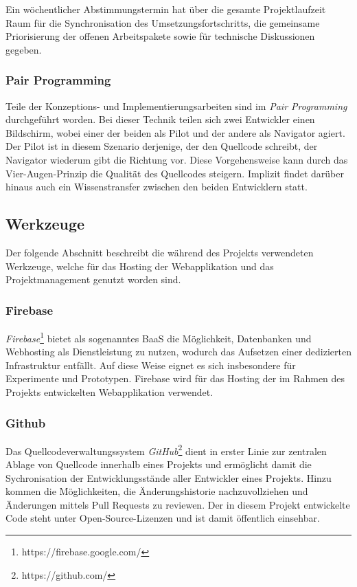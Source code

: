 Ein wöchentlicher Abstimmungstermin hat über die gesamte Projektlaufzeit Raum für die Synchronisation des Umsetzungsfortschritts, die gemeinsame Priorisierung der offenen Arbeitspakete sowie für technische Diskussionen gegeben.

\subsubsection{Pair Programming}
\label{pair_programming}

Teile der Konzeptions- und Implementierungsarbeiten sind im \emph{Pair Programming} durchgeführt worden. Bei dieser Technik teilen sich zwei Entwickler einen Bildschirm, wobei einer der beiden als Pilot und der andere als Navigator agiert. Der Pilot ist in diesem Szenario derjenige, der den Quellcode schreibt, der Navigator wiederum gibt die Richtung vor. Diese Vorgehensweise kann durch das Vier-Augen-Prinzip die Qualität des Quellcodes steigern. Implizit findet darüber hinaus auch ein Wissenstransfer zwischen den beiden Entwicklern statt.

\subsection{Werkzeuge}
\label{werkzeuge_und_projektstruktur}

Der folgende Abschnitt beschreibt die während des Projekts verwendeten Werkzeuge, welche für das Hosting der Webapplikation und das Projektmanagement genutzt worden sind.

\subsubsection{Firebase}
\label{firebase}

\emph{Firebase}\footnote{https://firebase.google.com/} bietet als sogenanntes \ac{BaaS} die Möglichkeit, Datenbanken und Webhosting als Dienstleistung zu nutzen, wodurch das Aufsetzen einer dedizierten Infrastruktur entfällt. Auf diese Weise eignet es sich insbesondere für Experimente und Prototypen. Firebase wird für das Hosting der im Rahmen des Projekts entwickelten Webapplikation verwendet.

\subsubsection{Github}
\label{github}

Das Quellcodeverwaltungssystem \emph{GitHub}\footnote{https://github.com/} dient in erster Linie zur zentralen Ablage von Quellcode innerhalb eines Projekts und ermöglicht damit die Sychronisation der Entwicklungsstände aller Entwickler eines Projekts. Hinzu kommen die Möglichkeiten, die Änderungshistorie nachzuvollziehen und Änderungen mittels Pull Requests zu reviewen. Der in diesem Projekt entwickelte Code steht unter Open-Source-Lizenzen und ist damit öffentlich einsehbar.

